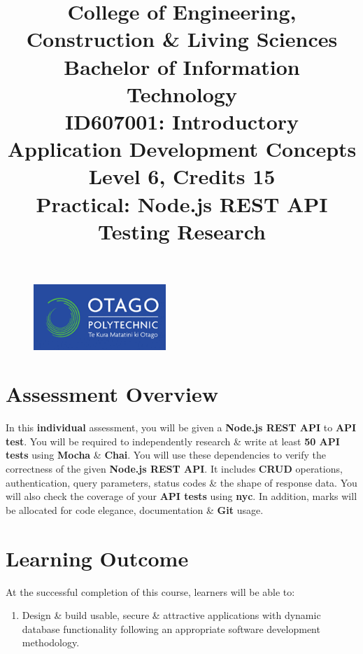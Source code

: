 \documentclass{article}
\author{}
\begin{document}
\begin{figure}
    \centering
    \includegraphics[width=50mm]{../img/logo.png}
\end{figure}

\title{College of Engineering, Construction \& Living Sciences\\Bachelor of Information Technology\\ID607001: Introductory Application Development Concepts\\Level 6, Credits 15\\\textbf{Practical: Node.js REST API Testing Research}}
\date{}
\maketitle

\section*{Assessment Overview}
In this \textbf{individual} assessment, you will be given a \textbf{Node.js REST API} to \textbf{API test}. You will be required to independently research \& write at least \textbf{50 API tests} using \textbf{Mocha} \& \textbf{Chai}. You will use these dependencies to verify the correctness of the given \textbf{Node.js REST API}. It includes \textbf{CRUD} operations, authentication, query parameters, status codes \& the shape of response data. You will also check the coverage of your \textbf{API tests} using \textbf{nyc}. In addition, marks will be allocated for code elegance, documentation \& \textbf{Git} usage. 

\section*{Learning Outcome}
At the successful completion of this course, learners will be able to:
\begin{enumerate}
    \item Design \& build usable, secure \& attractive applications with dynamic database functionality following an appropriate software development methodology.
\end{enumerate}
\end{document}
